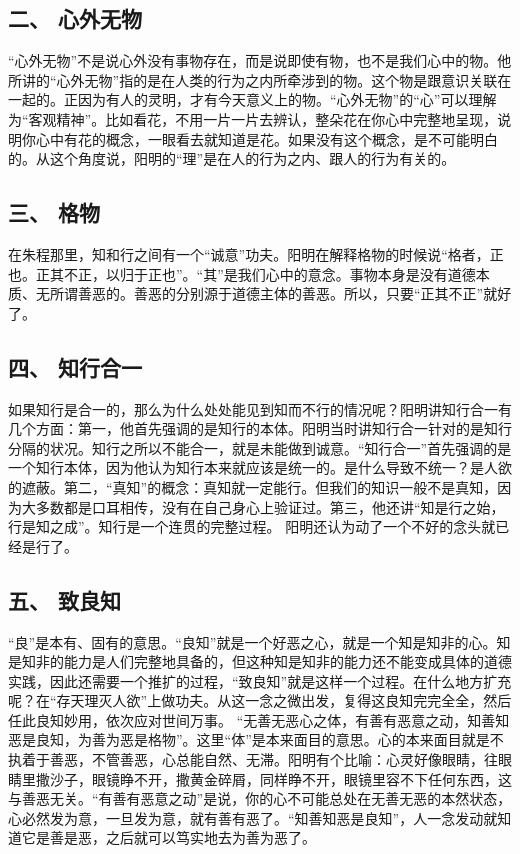 \documentclass{article}
\begin{document}
\subsection{二、	心外无物}
“心外无物”不是说心外没有事物存在，而是说即使有物，也不是我们心中的物。他所讲的“心外无物”指的是在人类的行为之内所牵涉到的物。这个物是跟意识关联在一起的。正因为有人的灵明，才有今天意义上的物。“心外无物”的“心”可以理解为“客观精神”。比如看花，不用一片一片去辨认，整朵花在你心中完整地呈现，说明你心中有花的概念，一眼看去就知道是花。如果没有这个概念，是不可能明白的。从这个角度说，阳明的“理”是在人的行为之内、跟人的行为有关的。
\subsection{三、	格物}
在朱程那里，知和行之间有一个“诚意”功夫。阳明在解释格物的时候说“格者，正也。正其不正，以归于正也”。“其”是我们心中的意念。事物本身是没有道德本质、无所谓善恶的。善恶的分别源于道德主体的善恶。所以，只要“正其不正”就好了。
\subsection{四、	知行合一}
如果知行是合一的，那么为什么处处能见到知而不行的情况呢？阳明讲知行合一有几个方面：第一，他首先强调的是知行的本体。阳明当时讲知行合一针对的是知行分隔的状况。知行之所以不能合一，就是未能做到诚意。“知行合一”首先强调的是一个知行本体，因为他认为知行本来就应该是统一的。是什么导致不统一？是人欲的遮蔽。第二，“真知”的概念：真知就一定能行。但我们的知识一般不是真知，因为大多数都是口耳相传，没有在自己身心上验证过。第三，他还讲“知是行之始，行是知之成”。知行是一个连贯的完整过程。
阳明还认为动了一个不好的念头就已经是行了。
\subsection{五、	致良知}
“良”是本有、固有的意思。“良知”就是一个好恶之心，就是一个知是知非的心。知是知非的能力是人们完整地具备的，但这种知是知非的能力还不能变成具体的道德实践，因此还需要一个推扩的过程，“致良知”就是这样一个过程。在什么地方扩充呢？在“存天理灭人欲”上做功夫。从这一念之微出发，复得这良知完完全全，然后任此良知妙用，依次应对世间万事。
“无善无恶心之体，有善有恶意之动，知善知恶是良知，为善为恶是格物”。这里“体”是本来面目的意思。心的本来面目就是不执着于善恶，不管善恶，心总能自然、无滞。阳明有个比喻：心灵好像眼睛，往眼睛里撒沙子，眼镜睁不开，撒黄金碎屑，同样睁不开，眼镜里容不下任何东西，这与善恶无关。“有善有恶意之动”是说，你的心不可能总处在无善无恶的本然状态，心必然发为意，一旦发为意，就有善有恶了。“知善知恶是良知”，人一念发动就知道它是善是恶，之后就可以笃实地去为善为恶了。
\end{document}
